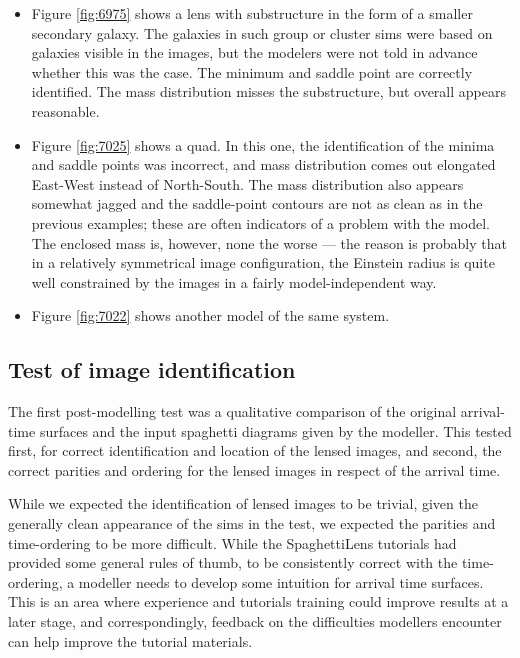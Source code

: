 \documentclass[usenatbib]{mn2e}
\newcommand{\spl}{SpaghettiLens\xspace}
\begin{document}
\begin{itemize}
\item Figure \ref{fig:6975} shows a lens with substructure in the form
  of a smaller secondary galaxy.  The galaxies in such group or
  cluster sims were based on galaxies visible in the images, but the
  modelers were not told in advance whether this was the case.  The
  minimum and saddle point are correctly identified.  The mass
  distribution misses the substructure, but overall appears
  reasonable.

\item Figure \ref{fig:7025} shows a quad.  In this one, the
  identification of the minima and saddle points was incorrect, and
  mass distribution comes out elongated East-West instead of
  North-South.  The mass distribution also appears somewhat jagged and
  the saddle-point contours are not as clean as in the previous
  examples; these are often indicators of a problem with the model.
  The enclosed mass is, however, none the worse --- the reason is
  probably that in a relatively symmetrical image configuration, the
  Einstein radius is quite well constrained by the images in a fairly
  model-independent way.

\item Figure \ref{fig:7022} shows another model of the same system.

\end{itemize}



\subsection{Test of image identification} \label{sec:tests.t1}

The first post-modelling test was a qualitative comparison of the
original arrival-time surfaces and the input spaghetti diagrams given
by the modeller.  This tested first, for correct identification and
location of the lensed images, and second, the correct parities and
ordering for the lensed images in respect of the arrival time.

While we expected the identification of lensed images to be trivial,
given the generally clean appearance of the sims in the test, we
expected the parities and time-ordering to be more difficult.  While
the \spl tutorials had provided some general rules of thumb, to be
consistently correct with the time-ordering, a modeller needs to
develop some intuition for arrival time surfaces.  This is an area
where experience and tutorials training could improve results at a
later stage, and correspondingly, feedback on the difficulties
modellers encounter can help improve the tutorial materials.
\end{document}
